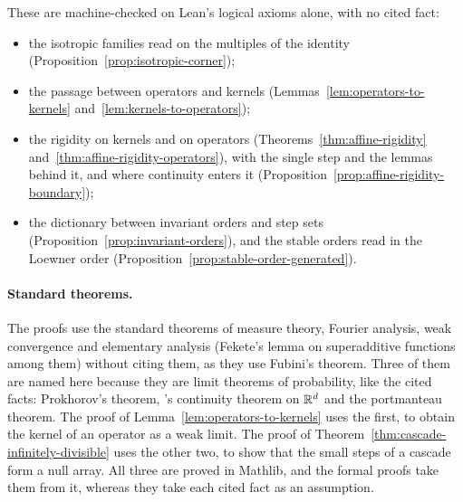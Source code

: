 These are machine-checked on Lean's logical axioms alone, with no cited fact:
\begin{itemize}
\item the isotropic families read on the multiples of the identity
(Proposition~\ref{prop:isotropic-corner});
\item the passage between operators and kernels (Lemmas~\ref{lem:operators-to-kernels}
and~\ref{lem:kernels-to-operators});
\item the rigidity on kernels and on operators (Theorems~\ref{thm:affine-rigidity}
and~\ref{thm:affine-rigidity-operators}), with the single step and the lemmas behind it, and where
continuity enters it (Proposition~\ref{prop:affine-rigidity-boundary});
\item the dictionary between invariant orders and step sets (Proposition~\ref{prop:invariant-orders}),
and the stable orders read in the Loewner order (Proposition~\ref{prop:stable-order-generated}).
\end{itemize}

\paragraph{Standard theorems.} The proofs use the standard theorems of measure theory, Fourier
analysis, weak convergence and elementary analysis (Fekete's lemma on superadditive functions
among them) without citing them, as they use Fubini's theorem. Three of them are
named here because they are limit theorems of probability, like the cited facts: Prokhorov's
theorem, \Levy's continuity theorem on $\mathbb{R}^d$ and the portmanteau theorem. The proof of
Lemma~\ref{lem:operators-to-kernels} uses the first, to obtain the kernel of an operator as a weak
limit. The proof of Theorem~\ref{thm:cascade-infinitely-divisible} uses the other two, to show that
the small steps of a cascade form a null array. All three are proved in Mathlib, and the formal
proofs take them from it, whereas they take each cited fact as an assumption.

